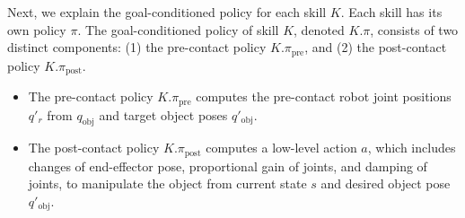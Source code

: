 Next, we explain the goal-conditioned policy for each skill \( K \). Each skill has its own policy \( \pi \). The goal-conditioned policy of skill \( K \), denoted \( K.\pi \), consists of two distinct components: (1) the pre-contact policy \( K.\pi_\text{pre} \), and (2) the post-contact policy \( K.\pi_\text{post} \). %
\begin{itemize}
\item The pre-contact policy $K.\pi_\text{pre}$ computes the pre-contact robot joint positions $q'_r$ from $q_\text{obj}$ and target object poses $q'_\text{obj}$.
\item The post-contact policy $K.\pi_\text{post}$ computes a low-level action $a$, which includes changes of end-effector pose, proportional gain of joints, and damping of joints, to manipulate the object from current state $s$ and desired object pose $q'_\text{obj}$.

\end{itemize}




